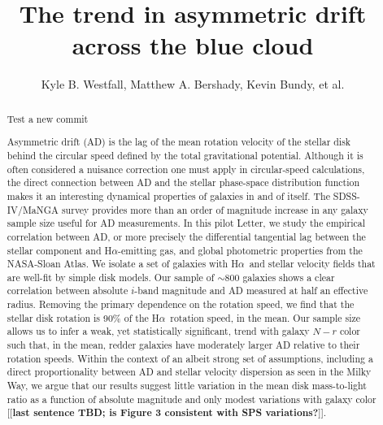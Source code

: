 \documentclass[apj,iop,revtex4,numberedappendix]{emulateapj}
\newcommand{\comment}[2][todo]{{\color{#1}[[{\bf #2}]]}}
\newcommand{\halpha}{H$\alpha$}
\begin{document}
\title{ The trend in asymmetric drift across the blue cloud }

\author{ Kyle B. Westfall, Matthew A.
Bershady, Kevin Bundy, et al. }




\begin{abstract}

Test a new commit

Asymmetric drift (AD) is the lag of the mean rotation velocity of the
stellar disk behind the circular speed defined by the total
gravitational potential.  Although it is often considered a nuisance
correction one must apply in circular-speed calculations, the direct
connection between AD and the stellar phase-space distribution function
makes it an interesting dynamical properties of galaxies in and of
itself.  The SDSS-IV/MaNGA survey provides more than an order of
magnitude increase in any galaxy sample size useful for AD measurements.
In this pilot Letter, we study the empirical correlation between AD, or
more precisely the differential tangential lag between the stellar
component and \halpha-emitting gas, and global photometric properties
from the NASA-Sloan Atlas.  We isolate a set of galaxies with \halpha\
and stellar velocity fields that are well-fit by simple disk models.
Our sample of $\sim$800 galaxies shows a clear correlation between
absolute $i$-band magnitude and AD measured at half an effective radius.
Removing the primary dependence on the rotation speed, we find that the
stellar disk rotation is 90\% of the \halpha\ rotation speed, in the
mean.  Our sample size allows us to infer a weak, yet statistically
significant, trend with galaxy $N-r$ color such that, in the mean,
redder galaxies have moderately larger AD relative to their rotation
speeds.  Within the context of an albeit strong set of assumptions,
including a direct proportionality between AD and stellar velocity
dispersion as seen in the Milky Way, we argue that our results suggest
little variation in the mean disk mass-to-light ratio as a function of
absolute magnitude and only modest variations with galaxy color
\comment{last sentence TBD; is Figure 3 consistent with SPS
variations?}.

\end{abstract}
\end{document}
